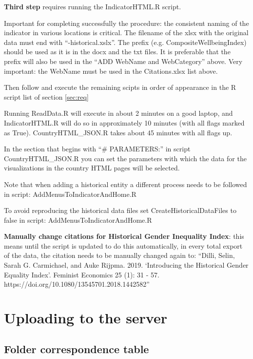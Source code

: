 \documentclass[a4paper]{article}
\begin{document}
\textbf{Third step} requires running the IndicatorHTML.R script. 

Important for completing successfully the procedure: the consistent naming of 
the indicator in various locations is critical. The filename of the xlsx with 
the original data must end with ``-historical.xslx''. The prefix (e.g. 
CompositeWellbeingIndex) should be used as it is in the docx and the txt files. 
It is preferable that the prefix will also be used in the ``ADD WebName and 
WebCategory'' above. Very important: the WebName must be used in the 
Citations.xlsx list above.

Then follow and execute the remaining scipts in order of appearance in the R script list of section \ref{sec:req}

Running ReadData.R will execute in about 2 minutes on a good laptop, and 
IndicatorHTML.R will do so in approximately 10 minutes (with all flags marked 
as True). CountryHTML\_JSON.R takes about 45 minutes with all flags up.

In the section that begins with ``\# PARAMETERS:'' in script CountryHTML\_JSON.R
you can set the parameters with which the data for the visualizations in the 
country HTML pages will be selected.

Note that when adding a historical entity a different process needs to be 
followed in script: AddMenusToIndicatorAndHome.R

To avoid reproducing the historical data files set CreateHistoricalDataFiles to 
false in script: AddMenusToIndicatorAndHome.R

\textbf{Manually change citations for Historical Gender Inequality Index}: this means
until the script is updated to do this automatically, in every total export of the data, the citation needs to be manually changed again to: ``Dilli, Selin, Sarah G. Carmichael, and Auke Rijpma. 2019. `Introducing the Historical Gender Equality Index'. Feminist Economics 25 (1): 31 - 57. https://doi.org/10.1080/13545701.2018.1442582''

\section{Uploading to the server}

\subsection{Folder correspondence table}
\end{document}

